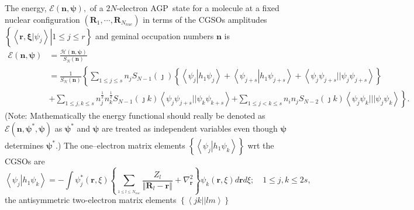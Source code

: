 \documentclass[aps,preprint]{revtex4}%
\begin{document}
The energy, $\mathcal{E}\left(  \boldsymbol{n,\psi}\right)  ,$ of a
$2N$-electron AGP\ state for a molecule at a fixed nuclear configuration
$\left(  \boldsymbol{R}_{1},\cdots,\boldsymbol{R}_{N_{nuc}}\right)  $ in terms
of the CGSOs amplitudes $\left\{  \left.  \left\langle \left.
\boldsymbol{r,\xi}\right\vert \psi_{j}\right\rangle \right\vert 1\leq j\leq
r\right\}  $ and geminal occupation numbers $\boldsymbol{n}$ is
\begin{align}
\mathcal{E}\left(  \boldsymbol{n,\psi}\right)   &  =\frac{\mathcal{H}\left(
\boldsymbol{n,\psi}\right)  }{S_{N}\left(  \boldsymbol{n}\right)  }\nonumber\\
&  =\frac{1}{S_{N}\left(  \boldsymbol{n}\right)  }\left\{  \sum_{1\leq j\leq
s}n_{j}S_{N-1}\left(  \jmath\right)  \left\{  \left\langle \psi_{j}\left\vert
h_{1}\psi_{j}\right.  \right\rangle +\left\langle \psi_{j+s}\left\vert
h_{1}\psi_{j+s}\right.  \right\rangle +\left\langle \psi_{j}\psi_{j+s}%
||\psi_{j}\psi_{j+s}\right\rangle \right\}  \right. \nonumber\\
&  +\sum_{1\leq j,k\leq s}n_{j}^{\frac{1}{2}}n_{k}^{\frac{1}{2}}S_{N-1}\left(
\jmath k\right)  \left\langle \psi_{j}\psi_{j+s}||\psi_{k}\psi_{k+s}%
\right\rangle \left.  +\sum_{1\leq j<k\leq s}n_{i}n_{j}S_{N-2}\left(  \jmath
k\right)  \left\langle \psi_{j}\psi_{k}|||\psi_{j}\psi_{k}\right\rangle
\right\}  . \label{energy}%
\end{align}
(Note: Mathematically the energy functional should really be denoted as
$\mathcal{E}\left(  \boldsymbol{n,\psi}^{\ast}\boldsymbol{,\psi}\right)  $ as
$\boldsymbol{\psi}^{\ast}$ and $\boldsymbol{\psi}$ are treated as independent
variables even though $\boldsymbol{\psi}$ determines $\boldsymbol{\psi}^{\ast
}$.) The one--electron matrix elements $\left\{  \left\langle \psi
_{j}\left\vert h_{1}\psi_{k}\right.  \right\rangle \right\}  $ wrt the CGSOs
are
\begin{equation}
\left\langle \psi_{j}\left\vert h_{1}\psi_{k}\right.  \right\rangle =-\int%
\psi_{j}^{\ast}\left(  \boldsymbol{r},\xi\right)  \left\{  \sum_{_{1\leq l\leq
N_{nuc}}}\frac{Z_{l}}{\left\Vert \boldsymbol{R}_{l}-\boldsymbol{r}\right\Vert
}+\nabla_{\boldsymbol{r}}^{2}\right\}  \psi_{k}\left(  \boldsymbol{r}%
,\xi\right)  d\boldsymbol{r}d\xi;\quad1\leq j,k\leq2s, \label{h1}%
\end{equation}
the antisymmetric two-electron matrix elements $\left\{  \left\langle
jk||lm\right\rangle \right\}  $
\end{document}
